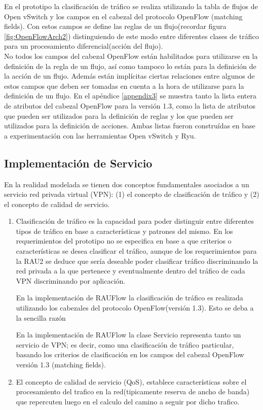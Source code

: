 En el prototipo la clasificaci\'on de tr\'afico se realiza utilizando la tabla de flujos de Open vSwitch y los campos en el cabezal del protocolo OpenFlow (matching fields). Con estos campos se define las reglas de un flujo(recordar figura \ref{fig:OpenFlowArch2}) distinguiendo de este modo entre diferentes clases de tr\'afico para un procesamiento diferencial(acci\'on del flujo).\\

No todos los campos del cabezal OpenFlow están habilitados para utilizarse en la definici\'on de la regla de un flujo, así como tampoco lo están para la definici\'on de la acci\'on de un flujo. Adem\'as est\'an implícitas ciertas relaciones entre algunos de estos campos que deben ser tomadas en cuenta a la hora de utilizarse para la definici\'on de un flujo. En el ap\'endice \ref{appendix3} se muestra tanto la lista entera de atributos del cabezal OpenFlow para la versi\'on 1.3, como la lista de atributos que pueden ser utilizados para la definici\'on de reglas y los que pueden ser utilizados para la definici\'on de acciones. Ambas listas fueron constru\'idas en base a experimentaci\'on con las herramientas Open vSwitch y Ryu.\\

\subsection{Implementación de Servicio}

En la realidad modelada se tienen dos conceptos fundamentales asociados a un servicio red privada virtual (VPN): (1) el concepto de clasificación de tr\'afico y (2) el concepto de calidad de servicio.

\begin{enumerate}
\item Clasificación de tr\'afico es la capacidad para poder distinguir entre diferentes tipos de tr\'afico en base a caracter\'isticas y patrones del mismo. En los requerimientos del prototipo no se especifica en base a que criterios o características se desea clasificar el tr\'afico, aunque de los requerimientos para la RAU2 se deduce que ser\'ia deseable poder clasificar tr\'afico discriminando la red privada a la que pertenece y eventualmente dentro del tr\'afico de cada VPN discriminando por aplicaci\'on. 

En la implementaci\'on de RAUFlow la clasificaci\'on de tr\'afico es realizada utilizando los cabezales del protocolo OpenFlow(versi\'on 1.3). Esto se deba a la sencilla raz\'on 

En la implementaci\'on de RAUFlow la clase Servicio representa tanto un servicio de VPN; es decir,  como una clasificaci\'on de tr\'afico particular, basando los criterios de clasificaci\'on en los campos del cabezal OpenFlow versi\'on 1.3 (matching fields).

\item El concepto de calidad de servicio (QoS), establece características sobre el procesamiento del trafico en la red(tipicamente reserva de ancho de banda) que repercuten luego en el calculo del camino a seguir por dicho trafico.
\end{enumerate}

